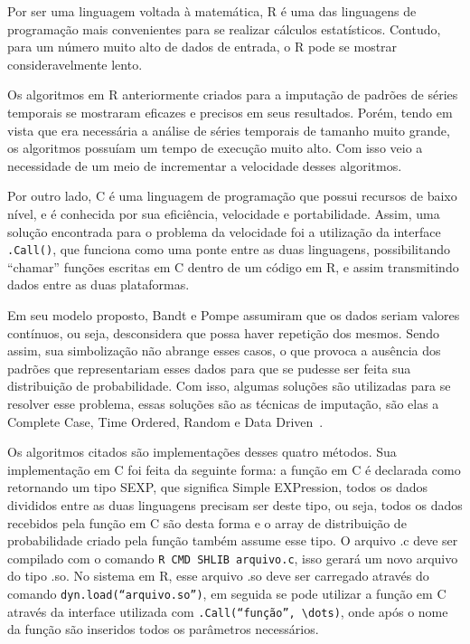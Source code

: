 \documentclass{article}
\begin{document}
Por ser uma linguagem voltada à matemática, R é uma das linguagens de programação mais convenientes para se realizar cálculos estatísticos. Contudo, para um número muito alto de dados de entrada, o R pode se mostrar consideravelmente lento.


Os algoritmos em R anteriormente criados para a imputação de padrões de séries temporais se mostraram eficazes e precisos em seus resultados. Porém, tendo em vista que era necessária a análise de séries temporais de tamanho muito grande, os algoritmos possuíam um tempo de execução muito alto. Com isso veio a necessidade de um meio de incrementar a velocidade desses algoritmos.

Por outro lado, C é uma linguagem de programação que possui recursos de baixo nível, e é conhecida por sua eficiência, velocidade e portabilidade. Assim, uma solução encontrada para o problema da velocidade foi a utilização da interface \verb|.Call()|, que funciona como uma ponte entre as duas linguagens, possibilitando “chamar” funções escritas em C dentro de um código em R, e assim transmitindo dados entre as duas plataformas.

Em seu modelo proposto, Bandt e Pompe assumiram que os dados seriam valores contínuos, ou seja, desconsidera que possa haver repetição dos mesmos. Sendo assim, sua simbolização não abrange esses casos, o que provoca a ausência dos padrões que representariam esses dados para que se pudesse ser feita sua distribuição de probabilidade. Com isso, algumas soluções são utilizadas para se resolver esse problema, essas soluções são as técnicas de imputação, são elas a Complete Case, Time Ordered, Random e Data Driven~\cite{traversaro2018bandt}.

Os algoritmos citados são implementações desses quatro métodos. Sua implementação em C foi feita da seguinte forma: a função em C é declarada como retornando um tipo SEXP, que significa Simple EXPression, todos os dados divididos entre as duas linguagens precisam ser deste tipo, ou seja, todos os dados recebidos pela função em C são desta forma e o array de distribuição de probabilidade criado pela função também assume esse tipo. O arquivo .c deve ser compilado com o comando \verb|R CMD SHLIB arquivo.c|, isso gerará um novo arquivo do tipo .so. No sistema em R, esse arquivo .so deve ser carregado através do comando \verb|dyn.load(“arquivo.so”)|, em seguida se pode utilizar a função em C através da interface utilizada com \verb|.Call(“função”, \dots)|, onde após o nome da função são inseridos todos os parâmetros necessários\cite{.Call}\cite{Extensions}.
\end{document}
